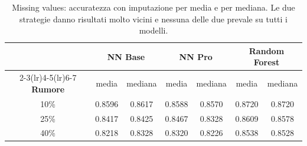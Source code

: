 \begin{table}[H]\centering\small
\caption{Missing values: accuratezza con imputazione per media e per mediana. Le due strategie danno risultati molto vicini e nessuna delle due prevale su tutti i modelli.}\label{tab:mvconfronto}
\begin{tabular}{c cc cc cc}
\toprule
 & \multicolumn{2}{c}{NN Base} & \multicolumn{2}{c}{NN Pro} & \multicolumn{2}{c}{Random Forest}\\
\cmidrule(lr){2-3}\cmidrule(lr){4-5}\cmidrule(lr){6-7}
\textbf{Rumore} & media & mediana & media & mediana & media & mediana \\
\midrule
10\% & 0.8596 & 0.8617 & 0.8588 & 0.8570 & 0.8720 & 0.8720 \\
25\% & 0.8417 & 0.8425 & 0.8467 & 0.8328 & 0.8609 & 0.8578 \\
40\% & 0.8218 & 0.8328 & 0.8320 & 0.8226 & 0.8538 & 0.8528 \\
\bottomrule
\end{tabular}
\end{table}
